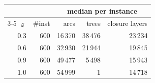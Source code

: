 \begin{tabular}{@{}rrrrr@{}}
\toprule
 &  & \multicolumn{3}{c}{median per instance} \\
\cmidrule(l){3-5}
$\varrho$ & \#inst & arcs & trees & closure layers \\
\midrule
0.3 & 600 & 16\,370 & 38\,476 & 23\,234 \\
0.6 & 600 & 32\,930 & 21\,944 & 19\,845 \\
0.9 & 600 & 49\,477 & 5\,498 & 15\,943 \\
1.0 & 600 & 54\,999 & 1 & 14\,718 \\
\bottomrule
\end{tabular}
